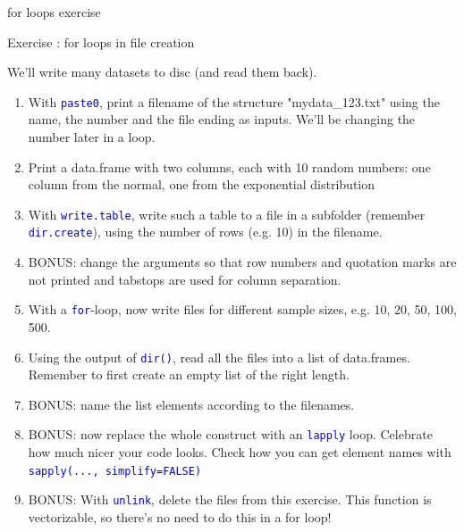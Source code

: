 \documentclass[xcolor=table,      handout ,    xcolor=dvipsnames]{beamer}\usepackage[]{graphicx}\usepackage[]{color}
\newcounter{exercisecount}
\newenvironment{exercise}[1]
{%
\stepcounter{exercisecount}
\begin{block}{Exercise \arabic{exercisecount}: #1}
}
{%
\end{block} }
\newcommand{\rcode}[1]{\texttt{\textcolor{Blue}{#1}}}
\begin{document}
\begin{frame}[fragile]{for loops exercise}
\begin{exercise}{for loops in file creation}
\scriptsize
We'll write many datasets to disc (and read them back).
\begin{enumerate}
\item With \rcode{paste0}, print a filename of the structure "mydata\_123.txt" 
      using the name, the number and the file ending as inputs. 
      We'll be changing the number later in a loop.
\item Print a data.frame with two columns, each with 10 random numbers: 
      one column from the normal, one from the exponential distribution
\item With \rcode{write.table}, write such a table to a file in a subfolder (remember \rcode{dir.create}), 
      using the number of rows (e.g. 10) in the filename.\\
\item BONUS: change the arguments so that row numbers and quotation marks are not printed and tabstops are used for column separation.
\item With a \rcode{for}-loop, now write files for different sample sizes, e.g. 10, 20, 50, 100, 500.
\item Using the output of \rcode{dir()}, read all the files into a list of data.frames.
      Remember to first create an empty list of the right length.
\item BONUS: name the list elements according to the filenames. 
\item BONUS: now replace the whole construct with an \rcode{lapply} loop. 
      Celebrate how much nicer your code looks. 
      Check how you can get element names with \rcode{sapply(..., simplify=FALSE)}
\item BONUS: With \rcode{unlink}, delete the files from this exercise. 
      This function is vectorizable, so there's no need to do this in a for loop!
\end{enumerate}
\end{exercise}
\normalsize
\end{frame}


\end{document}
